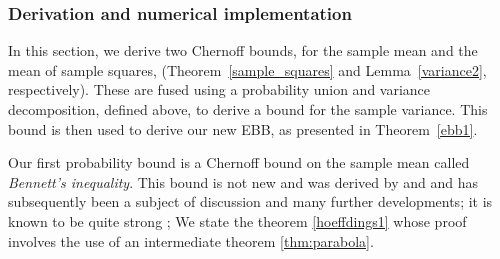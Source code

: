 

\subsubsection{Derivation and numerical implementation}
\label{derivation}
In this section, we derive two Chernoff bounds, 
for the sample mean and the mean of sample squares, (Theorem~\ref{sample_squares} and Lemma~\ref{variance2}, respectively). 
These are fused using a probability union and variance decomposition, defined above, to derive a bound for the sample variance. 
This bound is then used to derive our new EBB, as presented in Theorem~\ref{ebb1}.

Our first probability bound is a Chernoff bound on the sample mean called \textit{Bennett's inequality}. 
This bound is not new and was derived by \cite{hoeffding1} and \cite{10.2307/2282438} and has subsequently been a subject of discussion and many further developments; it is known to be quite strong \cite{Bentkus08boundsfor,Pinelis2014,zbMATH00812598}; 
We state the theorem \ref{hoeffdings1} whose proof involves the use of an intermediate theorem \ref{thm:parabola}.

